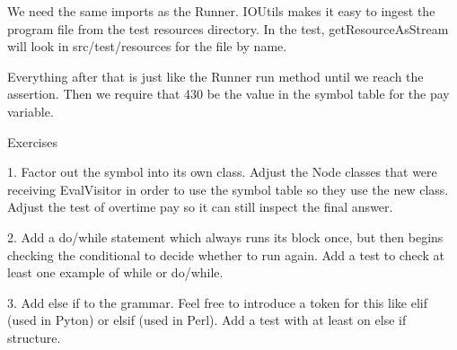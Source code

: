 We need the same imports as the Runner. IOUtils makes it easy to
ingest the program file from the test resources directory. In the
test, getResourceAsStream will look in src/test/resources for the file
by name.

Everything after that is just like the Runner run method until we
reach the assertion. Then we require that 430 be the value in the
symbol table for the pay variable.

Exercises

1. Factor out the symbol into its own class. Adjust the Node classes that were
   receiving EvalVisitor in order to use the symbol table so they use the new
   class. Adjust the test of overtime pay so it can still inspect the final
   answer.

2. Add a do/while statement which always runs its block once, but then
   begins checking the conditional to decide whether to run again.
   Add a test to check at least one example of while or do/while.

3. Add else if to the grammar. Feel free to introduce a token for this like
   elif (used in Pyton) or elsif (used in Perl).
   Add a test with at least on else if structure.
